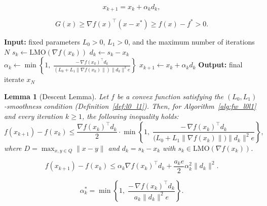 \documentclass[10pt,a4paper]{amsart}
\newtheorem{lemma}{Lemma}
\begin{document}
	\begin{equation}\label{fw_step_size}
		x_{k+1} = x_k + \alpha_k d_k,
	\end{equation}

	\begin{equation}\label{fw_gap}
		G(x) \geq \nabla f(x)^\top (x - x^*) \geq f(x) - f^* > 0.
	\end{equation}

	\begin{algorithm}
		\caption{$(L_0,L_1)$-Frank–Wolfe Algorithm ($(L_0,L_1)$-FW)}
		\label{alg:fw_l0l1}
		\begin{algorithmic}[1]
			\State \textbf{Input:} fixed parameters $L_0 > 0$, $L_1 > 0$, and the maximum number of iterations $N$
			\State $s_k \gets \mathrm{LMO}(\nabla f(x_k))$
			\State $d_k \gets s_k - x_k$
			\State $\displaystyle 
			\alpha_k \gets \min \left\{ 1,\;
			\frac{-\, \nabla f(x_k)^\top d_k}{\left(L_0 + L_1 \|\nabla f(x_k)\|\right) \|d_k\|^2 e} \right\}$
			\State $x_{k+1} \gets x_k + \alpha_k d_k$
			\EndFor
			\State \textbf{Output:} final iterate $x_N$
		\end{algorithmic}
	\end{algorithm}

	\begin{lemma}[Descent Lemma]\label{lemma:descent_lemma}
		Let $f$ be a convex function satisfying the $(L_{0},L_{1})$-smoothness condition (Definition~\ref{def:l0_l1}).  
		Then, for Algorithm~\ref{alg:fw_l0l1} and every iteration $k \ge 1$, the following inequality holds:
		\begin{equation*}
			f(x_{k+1}) - f(x_{k}) 
			\le \frac{\nabla f(x_{k})^{\top} d_{k}}{2}
			\cdot 
			\min\!\left\{1,\;
			\frac{-\,\nabla f(x_{k})^{\top} d_{k}}
			{\big(L_{0}+L_{1}\|\nabla f(x_{k})\|\big)\|d_{k}\|^{2}e}
			\right\},
		\end{equation*}
		where $D = \max_{x,y \in Q}\|x-y\|$ and $d_{k}=s_{k}-x_{k}$ with 
		$s_{k}\in \mathrm{LMO}(\nabla f(x_{k}))$.
	\end{lemma}

		\begin{equation}\label{th:sublinear_conv_rate2:upper_bnd_only_e}
			f(x_{k+1})-f(x_{k})
			\le \alpha_{k}\nabla f(x_{k})^{\top}d_{k}
			+\frac{a_{k}e}{2}\alpha_{k}^{2}\|d_{k}\|^{2}.
		\end{equation}

		\begin{equation}\label{step_size_def}
			\alpha_{k}^{*}
			=\min\!\left\{1,\;
			\frac{-\,\nabla f(x_{k})^{\top}d_{k}}
			{a_{k}\|d_{k}\|^{2}e}\right\}.
		\end{equation}
\end{document}
